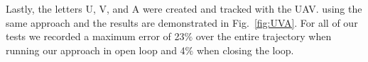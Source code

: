 \documentclass[letterpaper, 10 pt, conference]{ieeeconf}  %
\begin{document}


Lastly, the letters U, V, and A were created and tracked with the UAV. using the same approach and the results are demonstrated in Fig.~\ref{fig:UVA}. For all of our tests we recorded a maximum error of 23$\%$ over the entire trajectory when running our approach in open loop and 4$\%$ when closing the loop. 
\end{document}
